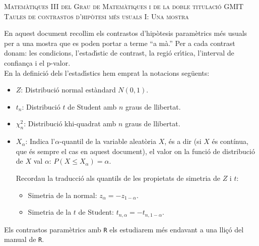 \documentclass{article}
\renewcommand{\leq}{\leqslant}
\begin{document}

\renewcommand{\thecas}{\Roman{cas}}
\newcommand{\posacas}{\addtocounter{cas}{1}{\bf \thecas}}

\begin{center}
\textsc{Matemàtiques III del Grau de Matemàtiques i de la doble titulació GMIT\\[0.5ex]  Taules de contrastos d'hip\`otesi m\'es usuals I: Una mostra}
\end{center}
\vspace*{2cm}

\noindent En aquest document recollim els contrastos d'hip\`otesis param\`etrics m\'es usuals per a una mostra  que es poden portar a terme ``a mà.'' Per a cada contrast donam: les condicions, l'estad\'{\i}stic
de contrast, la regi\'o cr\'{\i}tica, 
l'interval de confian\c ca i el p-valor.\\

En la definició dels l'estad\'{\i}stics hem emprat la notacions seg\"uents:
\begin{itemize}
\item  $Z$: {Distribuci\'o normal estàndard $N(0,1)$.} 
\item $t_n$: {Distribuci\'o
$t$ de Student amb $n$ graus de llibertat.} 
\item $\chi_n^2$: {Distribuci\'o
khi-quadrat amb $n$ graus de llibertat.} 
\item $X_\alpha$: Indica l'$\alpha$-quantil de la variable aleat\`oria $X$, és a dir (si $X$ és contínua, que és sempre el cas en aquest document), el valor on la
funci\'o de distribuci\'o de $X$ val $\alpha$: $P(X\leq X_\alpha
)=\alpha$. 

Recordau la traducció als quantils de les propietats de simetria de $Z$ i $t$:
\begin{itemize}
\item Simetria de la normal: $z_\alpha = -z_{1-\alpha}.$
\item Simetria de la $t$ de Student: $t_{n,\alpha} = -t_{n,1-\alpha}.$
\end{itemize}
\end{itemize}
Els contrastos paramètrics amb \texttt{R} els estudiarem més endavant a una lliçó del manual de \texttt{R}. 
\end{document}
